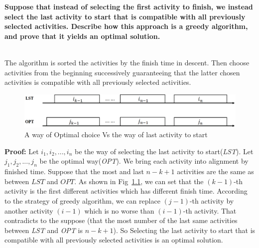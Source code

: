 
\chapter{}
\textbf{
Suppose that instead of selecting the first activity to finish, we instead select the last activity to start that is compatible with all previously selected activities. Describe how this approach is a greedy algorithm, and prove that it yields an optimal solution.
}

\hspace*{\fill} \\
The algorithm is sorted the activities by the finish time in descent. Then choose activities from the beginning successively guaranteeing that the latter chosen activities is compatible with all previously selected activities.

\begin{figure}[!htbp]
\centering
\includegraphics[width=1\textwidth]{figures/1.eps}
\caption{A way of Optimal choice Vs the way of last activity to start}\label{fig_1_1}
\end{figure}
\noindent
\textbf{Proof:}
Let $i_1, i_2, ..., i_n$ be the way of selecting the last activity to start(\emph{LST}). Let $j_1, j_2, ..., j_n$ be the optimal way(\emph{OPT}). We bring each activity into alignment by finished time. Suppose that the most and last $n-k+1$ activities are the same as between $LST$ and $OPT$. As shown in Fig~\ref{fig_1_1}, we can set that the $(k-1)$-th activity is the first different activities which has different finish time. According to the strategy of greedy algorithm, we can replace $(j-1)$-th activity by another activity $(i-1)$ which is no worse than $(i-1)$-th activity. That contradicts to the suppose (that the most number of the last same activities between \emph{LST} and \emph{OPT} is $n-k+1$). So Selecting the last activity to start that is compatible with all previously selected activities is an optimal solution.



